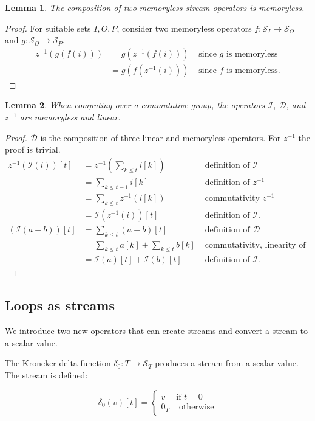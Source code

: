 \documentclass[10pt]{article}
\newtheorem{lemma}{Lemma}[section]
\newcommand{\stream}[1]{\ensuremath{\mathcal{S}_{#1}}}
\newcommand{\zm}{\ensuremath{z^{-1}}} %
\newcommand{\I}{\mathcal{I}}  %
\newcommand{\D}{\mathcal{D}}  %
\begin{document}
\begin{lemma}
  The composition of two memoryless stream operators is memoryless.
\end{lemma}
\begin{proof}
  For suitable sets $I, O, P$, consider two memoryless operators $f:
  \stream{I} \rightarrow \stream{O}$ and $g: \stream{O} \rightarrow
  \stream{P}$.
$$
\begin{aligned}
  \zm(g(f(i))) &= g(\zm(f(i))) & \mbox{ since $g$ is memoryless} \\
  &= g(f(\zm(i))) & \mbox{ since $f$ is memoryless}.
\end{aligned}
$$
\end{proof}

\begin{lemma}
  When computing over a commutative group, the operators $\I$, $\D$,
  and $\zm$ are memoryless and linear.
\end{lemma}
\begin{proof}
  $\D$ is the composition of three linear and memoryless operators.
  For $\zm$ the proof is trivial.
  $$
\begin{aligned}
  \zm(\I(i))[t] &= \zm(\sum_{k \leq t} i[k]) & \mbox{ definition of }\I \\
  &= \sum_{k \leq t-1} i[k] & \mbox{ definition of }\zm \\
  &= \sum_{k \leq t} \zm(i[k]) & \mbox{ commutativity }\zm \\
  &= \I(\zm(i))[t] & \mbox{ definition of }\I. \\
  (\I(a + b))[t] &= \sum_{k \leq t}(a + b)[t] & \mbox{ definition of }\D \\
  &= \sum_{k \leq t} a[k] + \sum_{k \leq t} b[k] & \mbox{ commutativity, linearity of + } \\
  &= \I(a)[t] + \I(b)[t] & \mbox{ definition of }\I.
\end{aligned}
$$
\end{proof}

\subsection{Loops as streams}

We introduce two new operators that can create streams and convert a
stream to a scalar value.

The Kroneker delta function $\delta_0 : T \rightarrow \stream{T}$
produces a stream from a scalar value.  The stream is
defined:

$$\delta_0(v)[t] = \left\{
\begin{array}{ll}
  v & \mbox{if } t = 0 \\
  0_T & \mbox{ otherwise}
\end{array}
\right.
$$
\end{document}
